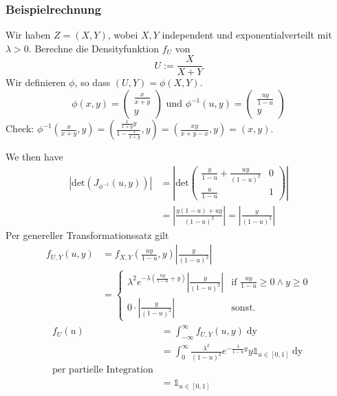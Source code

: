 \subsubsection*{Beispielrechnung}
Wir haben $Z = (X, Y)$, wobei $X, Y$ independent und exponentialverteilt mit $\lambda > 0$. Berechne die Densityfunktion $f_U$ von $$U:= \frac{X}{X+Y}$$
Wir definieren $\phi$, so dass $(U, Y) = \phi(X, Y)$.
\[\phi(x, y) = \left(\begin{matrix}
    \frac{x}{x+y}\\
    y
\end{matrix}\right) \text{ und } \phi^{-1}(u, y) = \left(\begin{matrix}
    \frac{uy}{1-u}\\
    y
\end{matrix}\right)\]
Check: $\phi^{-1}\left(\frac{x}{x+y}, y\right) = \left(\frac{\frac{x}{x+y}y}{1-\frac{x}{x+y}}, y\right) = \left(\frac{xy}{x+y-x}, y\right) = \left(x, y\right).$ 

We then have 
\begin{align*}
    \left|\text{det}\left(J_{\phi^{-1}}(u,y)\right)\right| &= \left\vert\text{det}\left(\begin{matrix}
        \frac{y}{1-u}+\frac{uy}{(1-u)^2} & 0\\
        \frac{u}{1-u} & 1
    \end{matrix}\right) \right\vert\\
    &= \left|\frac{y(1-u)+uy}{(1-u)^2}\right| = \left|\frac{y}{(1-u)^2}\right|
\end{align*}
Per genereller Transformationssatz gilt
\begin{align*}
    f_{U,Y}(u,y) &= f_{X, Y}\left(\frac{uy}{1-u}, y\right)\left\vert\frac{y}{(1-u)^2}\right\vert\\
                &= \begin{cases}
                    \lambda^2 e^{-\lambda\left(\frac{uy}{1-u}+y\right)}\left\vert\frac{y}{(1-u)^2}\right\vert &\text{if } \frac{uy}{1-u} \geq 0 \land y \geq 0\\
                    0 \cdot \left\vert\frac{y}{(1-u)^2}\right\vert & \text{sonst.}
                \end{cases}
\end{align*}
\begin{align*}
    f_U(u) &= \int_{-\infty}^\infty f_{U,Y}(u,y) \mathop{dy}\\
            &= \int_{0}^\infty \frac{\lambda^2}{(1-u)^2}e^{-\frac{\lambda}{1-u}y}y \mathds{1}_{u\in[0,1]}\mathop{dy}\\
            \text{per partielle Integration}\\
            &= \mathds{1}_{u \in [0,1]}
\end{align*}